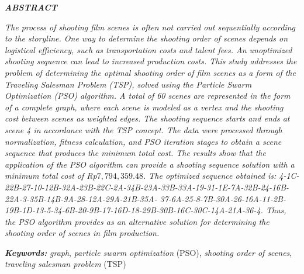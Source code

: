 \vspace{0.1cm}

{
    \singlespacing
    \begin{center}
        \textbf{\textit{ABSTRACT}}
    \end{center}
    \vspace{0.5cm}

    {\frenchspacing
        \textit{
            The process of shooting film scenes is often not carried out sequentially according to the storyline.
            One way to determine the shooting order of scenes depends on logistical efficiency, such as transportation costs and talent fees.
            An unoptimized shooting sequence can lead to increased production costs.
            This study addresses the problem of determining the optimal shooting order of film scenes as a form of the Traveling Salesman Problem (TSP), solved using the Particle Swarm Optimization (PSO) algorithm.
            A total of 60 scenes are represented in the form of a complete graph, where each scene is modeled as a vertex and the shooting cost between scenes as weighted edges.
            The shooting sequence starts and ends at scene 4 in accordance with the TSP concept.
            The data were processed through normalization, fitness calculation, and PSO iteration stages to obtain a scene sequence that produces the minimum total cost.
            The results show that the application of the PSO algorithm can provide a shooting sequence solution with a minimum total cost of Rp$7,794,359.48$.
            The optimized sequence obtained is: 4-1C-22B-27-10-12B-32A-23B-22C-2A-34B-23A-33B-33A-19-31-1E-7A-32B-24-16B-22A-3-35B-14B-9A-28-12A-29A-21B-35A-
            37-6A-25-8-7B-30A-26-16A-11-2B-19B-1D-13-5-34-6B-20-9B-17-16D-18-29B-30B-16C-30C-14A-21A-36-4.
            Thus, the PSO algorithm provides as an alternative solution for determining the shooting order of scenes in film production.
        }

        \vspace*{0.5cm}
        \noindent \textbf{\textit{Keywords:}} \textit{graph}, \textit{particle swarm optimization} (PSO), \textit{shooting order of scenes}, \textit{traveling salesman problem} (TSP)

    }
}

\pagebreak